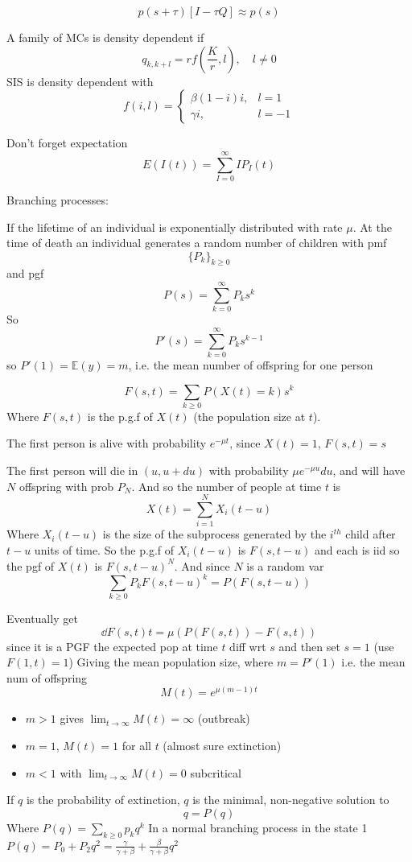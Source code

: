 \documentclass{X:/Documents/Coding/Latex/myassignment}
\begin{document}
\[p(s+\tau)[I-\tau Q] \approx p(s)\]


A family of MCs is density dependent if 
\[q_{k,k+l} = rf(\frac{K}{r}, l), \quad l\neq 0\]
SIS is density dependent with
\[f(i,l) = \begin{cases}
	\beta(1-i)i,& l=1\\
	\gamma i,& l=-1
\end{cases}\]



Don't forget expectation
\[E(I(t)) = \sum_{I=0}^\infty IP_I(t)\]



Branching processes:

If the lifetime of an individual is exponentially distributed with rate $\mu$.
At the time of death an individual generates a random number of children with pmf
\[\{P_k\}_{k\geq 0}\]
and pgf
\[P(s) = \sum_{k=0}^\infty P_ks^k\]
So
\[P'(s) = \sum_{k=0}^\infty P_k s^{k-1}\]
so $P'(1) = \mathbb{E}(y) = m$, i.e. the mean number of offspring for one person

\[F(s,t) = \sum_{k\geq 0} P(X(t) = k) s^k\]
Where $F(s,t)$ is the p.g.f of $X(t)$ (the population size at $t$).

The first person is alive with probability $e^{-\mu t}$, since $X(t) =1$, $F(s,t)=s$

The first person will die in $(u,u+du)$ with probability $\mu e^{-\mu u} du$, and will have $N$ offspring with prob $P_N$. And so the number of people at time $t$ is
\[X(t) = \sum_{i=1}^N X_i(t-u)\]
Where $X_i(t-u)$ is the size of the subprocess generated by the $i^{th}$ child after $t-u$ units of time.
So the p.g.f of $X_i(t-u)$ is $F(s,t-u)$ and each is iid so the pgf of $X(t)$ is $F(s,t-u)^N$. And since $N$ is a random var
\[\sum_{k\geq 0}P_k F(s,t-u)^k = P(F(s,t-u))\]

Eventually get
\[\dd{F(s,t)}{t} = \mu( P(F(s,t))- F(s,t)) \]
since it is a PGF the expected pop at time $t$ diff wrt $s$ and then set $s=1$ (use $F(1,t) =1$)
Giving the mean population size, where $m=P'(1)$ i.e. the mean num of offspring
\[M(t) = e^{\mu (m-1)t}\]
\begin{itemize}
	\item $m>1$ gives $\lim_{t\to\infty} M(t) =\infty$ (outbreak)
	\item $m=1$, $M(t)=1$ for all $t$ (almost sure extinction)
	\item $m<1$ with $\lim_{t\to\infty} M(t) =0$ subcritical
\end{itemize}

If $q$ is the probability of extinction, $q$ is the minimal, non-negative solution to 
\[q = P(q)\]
Where $P(q) =\sum_{k\geq 0} p_k q^k$
In a normal branching process in the state 1 $P(q) = P_0 + P_2 q^2 = \frac{\gamma}{\gamma+\beta} + \frac{\beta}{\gamma+\beta} q^2$
\end{document}
